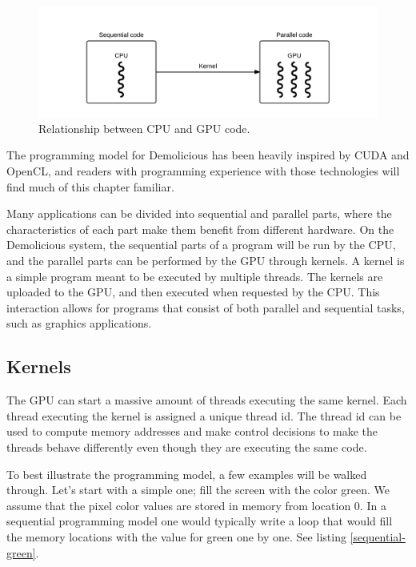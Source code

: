\documentclass[../main/report.tex]{subfiles}
\begin{document}
\begin{figure}[H]
	\centering
	\includegraphics[width=\textwidth]{../system_overview/diagrams/programming_model_cpu_gpu.png}
	\caption{Relationship between CPU and GPU code.}
	\label{fig:programming_model_cpu_gpu}
\end{figure}

The programming model for Demolicious has been heavily inspired by CUDA and OpenCL, 
and readers with programming experience with those technologies will find much of this chapter familiar.

Many applications can be divided into sequential and parallel parts,
where the characteristics of each part make them benefit from different hardware.
On the Demolicious system, the sequential parts of a program will be run by the CPU, and the parallel parts can be performed by the GPU through kernels.
A kernel is a simple program meant to be executed by multiple threads.
The kernels are uploaded to the GPU, and then executed when requested by the CPU.
This interaction allows for programs that consist of both parallel and sequential tasks, such as graphics applications.

\subsection{Kernels}
The GPU can start a massive amount of threads executing the same kernel.
Each thread executing the kernel is assigned a unique thread id.
The thread id can be used to compute memory addresses and make control decisions
to make the threads behave differently even though they are executing the same code.

To best illustrate the programming model, a few examples will be walked through.
Let's start with a simple one; fill the screen with the color green.
We assume that the pixel color values are stored in memory from location 0.
In a sequential programming model one would typically write a loop that would fill
the memory locations with the value for green one by one. 
See listing \ref{sequential-green}.
\end{document}
